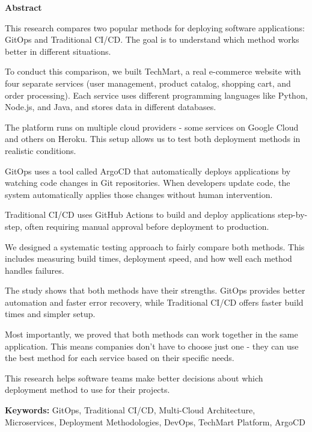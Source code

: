 \thispagestyle{empty}
\vspace*{\fill}

\begin{center}
{\Large \textbf{Abstract}}
\end{center}

\vspace{1cm}

This research compares two popular methods for deploying software applications: GitOps and Traditional CI/CD. The goal is to understand which method works better in different situations.

To conduct this comparison, we built TechMart, a real e-commerce website with four separate services (user management, product catalog, shopping cart, and order processing). Each service uses different programming languages like Python, Node.js, and Java, and stores data in different databases.

The platform runs on multiple cloud providers - some services on Google Cloud and others on Heroku. This setup allows us to test both deployment methods in realistic conditions.

GitOps uses a tool called ArgoCD that automatically deploys applications by watching code changes in Git repositories. When developers update code, the system automatically applies those changes without human intervention.

Traditional CI/CD uses GitHub Actions to build and deploy applications step-by-step, often requiring manual approval before deployment to production.

We designed a systematic testing approach to fairly compare both methods. This includes measuring build times, deployment speed, and how well each method handles failures.

The study shows that both methods have their strengths. GitOps provides better automation and faster error recovery, while Traditional CI/CD offers faster build times and simpler setup.

Most importantly, we proved that both methods can work together in the same application. This means companies don't have to choose just one - they can use the best method for each service based on their specific needs.

This research helps software teams make better decisions about which deployment method to use for their projects.

\textbf{Keywords:} GitOps, Traditional CI/CD, Multi-Cloud Architecture, Microservices, Deployment Methodologies, DevOps, TechMart Platform, ArgoCD

\vspace*{\fill}
\newpage